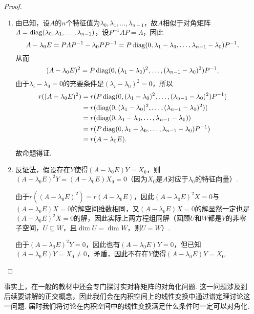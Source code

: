 \begin{proof}
    \begin{enumerate}
        \item 由已知，设$A$的$n$个特征值为$\lambda_0,\lambda_1,\ldots,\lambda_{n-1}$，故$A$相似于对角矩阵$\varLambda=\operatorname{diag}(\lambda_0,\lambda_1,\ldots,\lambda_{n-1})$，设$P^{-1}AP=\varLambda$，因此
              \[A-\lambda_0 E=P\varLambda P^{-1}-\lambda_0 PP^{-1}=P\operatorname{diag}(0,\lambda_1-\lambda_0,\ldots,\lambda_{n-1}-\lambda_0)P^{-1},\]
              从而
              \[(A-\lambda_0 E)^2=P\operatorname{diag}(0,(\lambda_1-\lambda_0)^2,\ldots,(\lambda_{n-1}-\lambda_0)^2)P^{-1},\]
              由于$\lambda_i-\lambda_0=0$的充要条件是$(\lambda_i-\lambda_0)^2=0$，所以
              \begin{align*}
                  r((A-\lambda_0 E)^2) & =r(P\operatorname{diag}(0,(\lambda_1-\lambda_0)^2,\ldots,(\lambda_{n-1}-\lambda_0)^2)P^{-1}) \\
                                       & =r(\operatorname{diag}(0,(\lambda_1-\lambda_0)^2,\ldots,(\lambda_{n-1}-\lambda_0)^2))        \\
                                       & =r(\operatorname{diag}(0,\lambda_1-\lambda_0,\ldots,\lambda_{n-1}-\lambda_0))                \\
                                       & =r(P\operatorname{diag}(0,\lambda_1-\lambda_0,\ldots,\lambda_{n-1}-\lambda_0)P^{-1})         \\
                                       & =r(A-\lambda_0 E).
              \end{align*}
              故命题得证.

        \item 反证法，假设存在$Y$使得$(A-\lambda_0 E)Y=X_0$，则$(A-\lambda_0 E)^2Y=(A-\lambda_0 E)X_0=0$（因为$X_0$是$A$对应于$\lambda_0$的特征向量）.

              由于$r((A-\lambda_0 E)^2)=r(A-\lambda_0 E)$，因此$(A-\lambda_0 E)^2X=0$与$(A-\lambda_0 E)X=0$的解空间维数相同，又$(A-\lambda_0 E)X=0$的解显然一定也是$(A-\lambda_0 E)^2X=0$的解，因此实际上两方程组同解（回顾$U$和$W$都是$V$的非零子空间，$U\subseteq W$，且$\dim U=\dim W$，则$U=W$）.

              由于$(A-\lambda_0 E)^2Y=0$，因此也有$(A-\lambda_0 E)Y=0$，但已知$(A-\lambda_0 E)Y=X_0\neq 0$，矛盾，因此不存在$Y$使得$(A-\lambda_0 E)Y=X_0$.
    \end{enumerate}
\end{proof}

事实上，在一般的教材中还会专门探讨实对称矩阵的对角化问题. 这一问题涉及到后续要讲解的正交概念，因此我们会在内积空间上的线性变换中通过谱定理讨论这一问题. 届时我们将讨论在内积空间中的线性变换满足什么条件时一定可以对角化.


